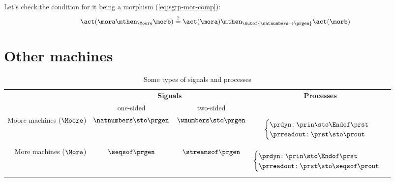 Let's check the condition for it being a morphism (\cref{eq:sgrp-mor-comp}):
\begin{equation}
  \act ( \mora \mthen_{\Moore} \morb) \stackrel{?}{=}  \act ( \mora) \mthen_{\Autof  {\natnumbers \to \prgen}} \act(\morb)
\end{equation}


\section{Other machines}


\begin{table*}[b]
  \caption{Some types of signals and processes}
  \label{tab:processes-types}
  \begin{tabular}{rccc}
  & \multicolumn{2}{c}{\textbf{Signals}} & \textbf{Processes} \\
  &\rule{0pt}{10pt} one-sided & two-sided &   \\
  Moore machines ($\Moore$) &
  $\natnumbers \sto \prgen$
  &
  $\wnumbers \sto \prgen$
  &
  \begin{minipage}{4cm}\raggedright
  \begin{equation*}\label{eq:a}
      \begin{cases}
      \prdyn \colon \prin \sto \Endof \prst \\
      \prreadout \colon \prst \sto \prout
      \end{cases}
  \end{equation*}
  \end{minipage}
  \\
  
  More machines ($\More$)& $\seqsof \prgen$ &  $\streamsof \prgen$ &
  \begin{minipage}{4cm}\raggedright
  \begin{equation*}
  \begin{cases}
  \prdyn \colon \prin \sto \Endof \prst \\
  \prreadout \colon \prst \sto \seqsof \prout
  \end{cases}
  \end{equation*}
  

\end{minipage}
\end{tabular}
\end{table*}
